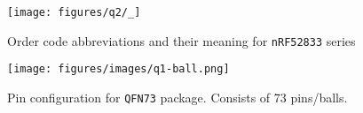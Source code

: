 \begin{figure}[p]
    \centering
    \texttt{[image: figures/q2/\_]}
    \vspace*{-3.5em}
    \caption{Order code abbreviations and their meaning for \texttt{nRF52833} series}
\end{figure}

\begin{figure}[p]
    \centering
    \texttt{[image: figures/images/q1-ball.png]}
    \caption{
        Pin configuration for \texttt{QFN73} package.
        Consists of 73 pins/balls.
    }
\end{figure}
